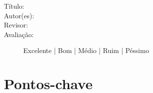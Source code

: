 \documentclass{UnBExam}%
\begin{document}
%

    \begin{description}%
        \item[Título:] %

        \item[Autor(es):] %

        \item[Revisor:] %

        \item[Avaliação:] %
        Excelente | Bom | Médio | Ruim | Péssimo
    \end{description}%

    \section{Pontos-chave}%
\end{document}
